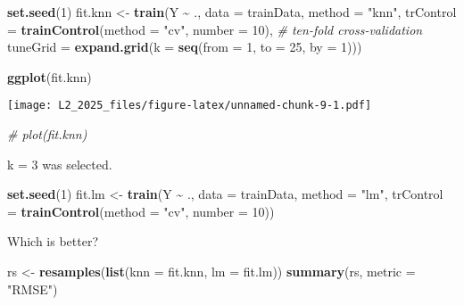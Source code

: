 \documentclass[
]{article}
\newenvironment{Shaded}{\begin{snugshade}}{\end{snugshade}}
\newcommand{\AttributeTok}[1]{\textcolor[rgb]{0.13,0.29,0.53}{#1}}
\newcommand{\CommentTok}[1]{\textcolor[rgb]{0.56,0.35,0.01}{\textit{#1}}}
\newcommand{\DecValTok}[1]{\textcolor[rgb]{0.00,0.00,0.81}{#1}}
\newcommand{\FunctionTok}[1]{\textcolor[rgb]{0.13,0.29,0.53}{\textbf{#1}}}
\newcommand{\NormalTok}[1]{#1}
\newcommand{\OtherTok}[1]{\textcolor[rgb]{0.56,0.35,0.01}{#1}}
\newcommand{\SpecialCharTok}[1]{\textcolor[rgb]{0.81,0.36,0.00}{\textbf{#1}}}
\newcommand{\StringTok}[1]{\textcolor[rgb]{0.31,0.60,0.02}{#1}}
\begin{document}
\begin{Shaded}
\begin{Highlighting}[]
\FunctionTok{set.seed}\NormalTok{(}\DecValTok{1}\NormalTok{)}
\NormalTok{fit.knn }\OtherTok{\textless{}{-}} \FunctionTok{train}\NormalTok{(Y }\SpecialCharTok{\textasciitilde{}}\NormalTok{ .,}
                 \AttributeTok{data =}\NormalTok{ trainData,}
                 \AttributeTok{method =} \StringTok{"knn"}\NormalTok{,}
                 \AttributeTok{trControl =} \FunctionTok{trainControl}\NormalTok{(}\AttributeTok{method =} \StringTok{"cv"}\NormalTok{, }\AttributeTok{number =} \DecValTok{10}\NormalTok{), }\CommentTok{\# ten{-}fold cross{-}validation}
                 \AttributeTok{tuneGrid =} \FunctionTok{expand.grid}\NormalTok{(}\AttributeTok{k =} \FunctionTok{seq}\NormalTok{(}\AttributeTok{from =} \DecValTok{1}\NormalTok{, }\AttributeTok{to =} \DecValTok{25}\NormalTok{, }\AttributeTok{by =} \DecValTok{1}\NormalTok{)))}

\FunctionTok{ggplot}\NormalTok{(fit.knn)}
\end{Highlighting}
\end{Shaded}

\texttt{[image: L2\_2025\_files/figure-latex/unnamed-chunk-9-1.pdf]}

\begin{Shaded}
\begin{Highlighting}[]
\CommentTok{\# plot(fit.knn)}
\end{Highlighting}
\end{Shaded}

k = 3 was selected.

\begin{Shaded}
\begin{Highlighting}[]
\FunctionTok{set.seed}\NormalTok{(}\DecValTok{1}\NormalTok{)}
\NormalTok{fit.lm }\OtherTok{\textless{}{-}} \FunctionTok{train}\NormalTok{(Y }\SpecialCharTok{\textasciitilde{}}\NormalTok{ .,}
                \AttributeTok{data =}\NormalTok{ trainData,}
                \AttributeTok{method =} \StringTok{"lm"}\NormalTok{,}
                \AttributeTok{trControl =} \FunctionTok{trainControl}\NormalTok{(}\AttributeTok{method =} \StringTok{"cv"}\NormalTok{, }\AttributeTok{number =} \DecValTok{10}\NormalTok{))}
\end{Highlighting}
\end{Shaded}

Which is better?

\begin{Shaded}
\begin{Highlighting}[]
\NormalTok{rs }\OtherTok{\textless{}{-}} \FunctionTok{resamples}\NormalTok{(}\FunctionTok{list}\NormalTok{(}\AttributeTok{knn =}\NormalTok{ fit.knn, }\AttributeTok{lm =}\NormalTok{ fit.lm))}
\FunctionTok{summary}\NormalTok{(rs, }\AttributeTok{metric =} \StringTok{"RMSE"}\NormalTok{)}
\end{Highlighting}
\end{Shaded}
\end{document}
